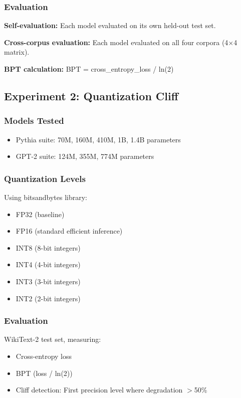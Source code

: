 \documentclass[11pt,a4paper]{article}
\begin{document}
\subsubsection{Evaluation}

\textbf{Self-evaluation:} Each model evaluated on its own held-out test set.

\textbf{Cross-corpus evaluation:} Each model evaluated on all four corpora (4$\times$4 matrix).

\textbf{BPT calculation:} BPT = cross\_entropy\_loss / ln(2)

\subsection{Experiment 2: Quantization Cliff}

\subsubsection{Models Tested}

\begin{itemize}
\item Pythia suite: 70M, 160M, 410M, 1B, 1.4B parameters
\item GPT-2 suite: 124M, 355M, 774M parameters
\end{itemize}

\subsubsection{Quantization Levels}

Using bitsandbytes library:
\begin{itemize}
\item FP32 (baseline)
\item FP16 (standard efficient inference)
\item INT8 (8-bit integers)
\item INT4 (4-bit integers)
\item INT3 (3-bit integers)
\item INT2 (2-bit integers)
\end{itemize}

\subsubsection{Evaluation}

WikiText-2 test set, measuring:
\begin{itemize}
\item Cross-entropy loss
\item BPT (loss / ln(2))
\item Cliff detection: First precision level where degradation $>$50\%
\end{itemize}
\end{document}
